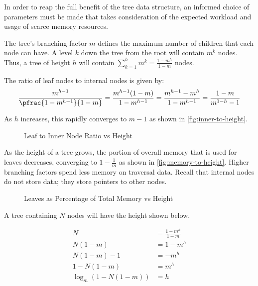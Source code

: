 \label{subsec:system-architecture}

\label{subsec:tree-parameters}


In order to reap the full benefit of the tree data structure, an informed choice
of parameters must be made that takes consideration of the expected workload and
usage of scarce memory resources.

The tree's branching factor $m$ defines the maximum number of children that each
node can have. A level $k$ down the tree from the root will contain $m^k$ nodes.
Thus, a tree of height $h$ will contain
$\sum_{k=1}^h m^k = \frac{1-m^h}{1-m}$ nodes.

The ratio of leaf nodes to internal nodes is given by:
$$
	\frac{m^{h-1}}{\pfrac{1-m^{h-1}}{1-m}}
	= \frac{m^{h-1}(1-m)}{1-m^{h-1}}
	= \frac{m^{h-1}-m^{h}}{1-m^{h-1}}
	= \frac{1-m}{m^{1-h} - 1}
$$

As $h$ increases, this rapidly converges to $m-1$ as shown in
\autoref{fig:inner-to-height}.

\begin{figure}
	\centering
	
	\caption{Leaf to Inner Node Ratio vs Height}
	\label{fig:inner-to-height}
\end{figure}

As the height of a tree grows, the portion of overall memory that is used for
leaves decreases, converging to $1-\frac{1}{m}$ as shown in
\autoref{fig:memory-to-height}. Higher branching factors spend less memory on
traversal data. Recall that internal nodes do not store data; they store
pointers to other nodes.

\begin{figure}
	\centering
	
	\caption{Leaves as Percentage of Total Memory vs Height}
	\label{fig:memory-to-height}
\end{figure}

A tree containing $N$ nodes will have the height shown below.

\begin{align*}
	N &= \frac{1-m^h}{1-m} \\
	N (1-m) &= 1-m^h \\
	N (1-m) - 1 &= -m^h \\
	1 - N (1-m) &= m^h \\
	\log_m\left(1 - N (1-m)\right) &= h
\end{align*}

